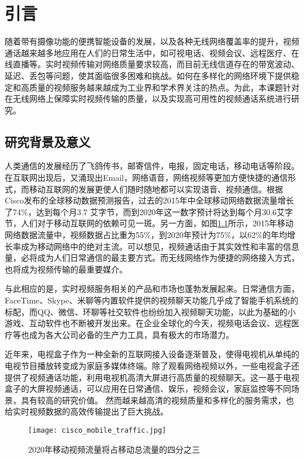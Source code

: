 \chapter{引言}
\label{chap:intro}
随着带有摄像功能的便携智能设备的发展，以及各种无线网络覆盖率的提升，视频通话越来越多地应用在人们的日常生活中，如可视电话、视频会议、远程医疗、在线直播等。实时视频传输对网络质量要求较高，而目前无线信道存在的带宽波动、延迟、丢包等问题，使其面临很多困难和挑战。如何在多样化的网络环境下提供稳定和高质量的视频服务越来越成为工业界和学术界关注的热点。为此，本课题针对在无线网络上保障实时视频传输的质量，以及实现高可用性的视频通话系统进行研究。

\section{研究背景及意义}
人类通信的发展经历了飞鸽传书，邮寄信件，电报，固定电话，移动电话等阶段。在互联网出现后，又涌现出Email，网络语音，网络视频等更加方便快捷的通信形式，而移动互联网的发展更使人们随时随地都可以实现语音、视频通信。根据Cisco发布的全球移动数据预测报告\cite{index2016global}，过去的2015年中全球移动网络数据流量增长了74\%，达到每个月3.7 艾字节，而到2020年这一数字预计将达到每个月30.6艾字节，人们对于移动互联网的依赖可见一斑。另一方面，如图\ref{fig:cisco_mobile}所示，2015年移动网络数据流量中，视频数据占比重为55\%，到2020年预计为75\%，以62\%的年均增长率成为移动网络中的绝对主流。可以想见，视频通话由于其实效性和丰富的信息量，必将成为人们日常通信的最主要方式。而无线网络作为便捷的网络接入方式，也将成为视频传输的最重要媒介。

与此相应的是，实时视频服务相关的产品和市场也蓬勃发展起来。日常通信方面，FaceTime、Skype、米聊等内置软件提供的视频聊天功能几乎成了智能手机系统的标配，而QQ、微信、环聊等社交软件也纷纷加入视频聊天功能，以此为基础的小游戏、互动软件也不断被开发出来。在企业全球化的今天，视频电话会议、远程医疗等也成为各大公司必备的生产力工具，具有极大的市场潜力。

近年来，电视盒子作为一种全新的互联网接入设备逐渐普及，使得电视机从单纯的电视节目播放转变成为家庭多媒体终端。除了观看网络视频以外，一些电视盒子还提供了视频通话功能，利用电视机高清大屏进行高质量的视频聊天。这一基于电视盒子的大屏视频通话，可以应用在日常通信、娱乐，视频会议，家庭监控等不同场景，具有较高的研究价值。
然而越来越高清的视频质量和多样化的服务需求，也给实时视频数据的高效传输提出了巨大挑战。

\begin{figure}[htbp]
  \centering
  \texttt{[image: cisco\_mobile\_traffic.jpg]}
  \caption{2020年移动视频流量将占移动总流量的四分之三}
  \label{fig:cisco_mobile}
\end{figure}

